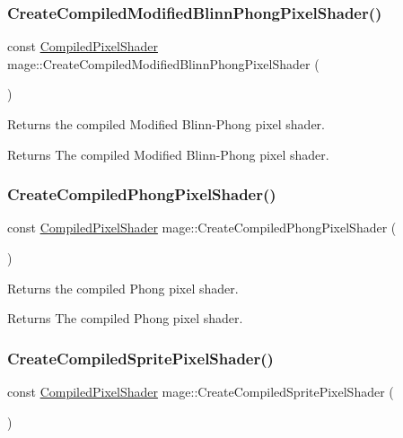 \subsubsection{\texorpdfstring{Create\+Compiled\+Modified\+Blinn\+Phong\+Pixel\+Shader()}{CreateCompiledModifiedBlinnPhongPixelShader()}}
{\footnotesize\ttfamily const \hyperlink{structmage_1_1_compiled_pixel_shader}{Compiled\+Pixel\+Shader} mage\+::\+Create\+Compiled\+Modified\+Blinn\+Phong\+Pixel\+Shader (\begin{DoxyParamCaption}{ }\end{DoxyParamCaption})}

Returns the compiled Modified Blinn-\/\+Phong pixel shader.

\begin{DoxyReturn}{Returns}
The compiled Modified Blinn-\/\+Phong pixel shader. 
\end{DoxyReturn}
\hypertarget{namespacemage_a7e79fbc943c11496ba5953b945cea257}{}\label{namespacemage_a7e79fbc943c11496ba5953b945cea257} 
\subsubsection{\texorpdfstring{Create\+Compiled\+Phong\+Pixel\+Shader()}{CreateCompiledPhongPixelShader()}}
{\footnotesize\ttfamily const \hyperlink{structmage_1_1_compiled_pixel_shader}{Compiled\+Pixel\+Shader} mage\+::\+Create\+Compiled\+Phong\+Pixel\+Shader (\begin{DoxyParamCaption}{ }\end{DoxyParamCaption})}

Returns the compiled Phong pixel shader.

\begin{DoxyReturn}{Returns}
The compiled Phong pixel shader. 
\end{DoxyReturn}
\hypertarget{namespacemage_a800fcb9d26d3f2fade19e42e3bf54724}{}\label{namespacemage_a800fcb9d26d3f2fade19e42e3bf54724} 
\subsubsection{\texorpdfstring{Create\+Compiled\+Sprite\+Pixel\+Shader()}{CreateCompiledSpritePixelShader()}}
{\footnotesize\ttfamily const \hyperlink{structmage_1_1_compiled_pixel_shader}{Compiled\+Pixel\+Shader} mage\+::\+Create\+Compiled\+Sprite\+Pixel\+Shader (\begin{DoxyParamCaption}{ }\end{DoxyParamCaption})}

